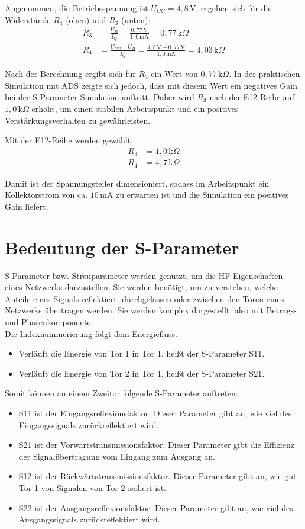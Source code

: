  Angenommen, die Betriebsspannung ist $U_{CC} = 4{,}8\,\mathrm{V}$, ergeben sich für die Widerstände $R_4$ (oben) und $R_3$ (unten):
 \begin{align}
     R_3 &= \frac{U_B}{I_Q} = \frac{0{,}77\,\mathrm{V}}{1{,}0\,\mathrm{mA}} = 0{,}77\,\mathrm{k}\Omega \\
     R_4 &= \frac{U_{CC} - U_B}{I_Q} = \frac{4{,}8\,\mathrm{V} - 0{,}77\,\mathrm{V}}{1{,}0\,\mathrm{mA}} = 4{,}03\,\mathrm{k}\Omega
 \end{align}

 Nach der Berechnung ergibt sich für $R_3$ ein Wert von $0{,}77\,\mathrm{k}\Omega$. In der praktischen Simulation mit ADS zeigte sich jedoch, dass mit diesem Wert ein negatives Gain bei der S-Parameter-Simulation auftritt. Daher wird $R_3$ nach der E12-Reihe auf $1{,}0\,\mathrm{k}\Omega$ erhöht, um einen stabilen Arbeitspunkt und ein positives Verstärkungsverhalten zu gewährleisten.

 Mit der E12-Reihe werden gewählt:
 \begin{align*}
     R_3 &= 1{,}0\,\mathrm{k}\Omega \\
     R_4 &= 4{,}7\,\mathrm{k}\Omega
 \end{align*}

 Damit ist der Spannungsteiler dimensioniert, sodass im Arbeitspunkt ein Kollektorstrom von ca. $10\,\mathrm{mA}$ zu erwarten ist und die Simulation ein positives Gain liefert.

\section{Bedeutung der S-Parameter}
S-Parameter bzw. Streuparameter werden genutzt, um die HF-Eigenschaften eines
Netzwerks darzustellen. Sie werden benötigt, um zu verstehen, welche Anteile eines Signals
reflektiert, durchgelassen oder zwischen den Toren eines Netzwerks übertragen werden.
Sie werden komplex dargestellt, also mit Betrags- und Phasenkomponente.
\\
Die Indexnummerierung folgt dem Energiefluss.
\clearpage

\begin{itemize}
    \item Verläuft die Energie von Tor 1 in Tor 1, heißt der S-Parameter S11.
    \item Verläuft die Energie von Tor 2 in Tor 1, heißt der S-Parameter S21.
\end{itemize}
Somit können an einem Zweitor folgende S-Parameter auftreten:
\begin{itemize}
    \item S11 ist der Eingangsreflexionsfaktor. Dieser Parameter gibt an, wie viel des Eingangssignals zurückreflektiert wird.
    \item S21 ist der Vorwärtstransmissionsfaktor. Dieser Parameter gibt die Effizienz der Signalübertragung vom Eingang zum Ausgang an.
    \item S12 ist der Rückwärtstransmissionsfaktor. Dieser Parameter gibt an, wie gut Tor 1 von Signalen von Tor 2 isoliert ist.
    \item S22 ist der Ausgangsreflexionsfaktor. Dieser Parameter gibt an, wie viel des Ausgangssignals zurückreflektiert wird.
\end{itemize}
